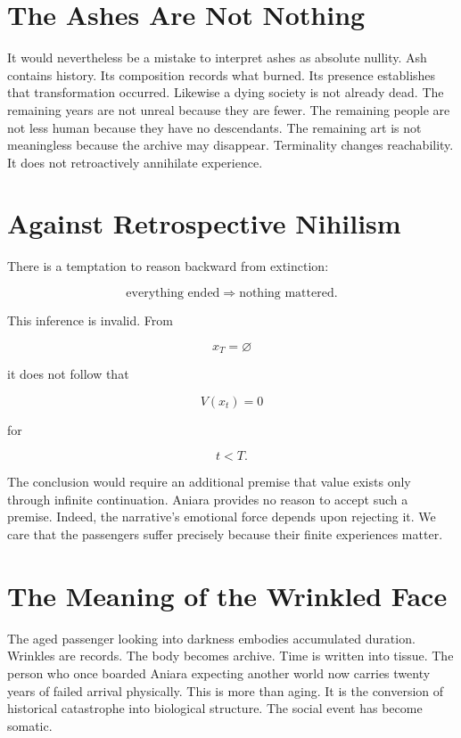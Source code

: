 \documentclass[11pt,oneside]{book}
\theoremstyle{definition}
\theoremstyle{remark}
\begin{document}
\section{The Ashes Are Not Nothing}

It would nevertheless be a mistake to interpret ashes as absolute nullity. Ash contains history. Its
composition records what burned. Its presence establishes that transformation occurred. Likewise a
dying society is not already dead. The remaining years are not unreal because they are fewer. The
remaining people are not less human because they have no descendants. The remaining art is not
meaningless because the archive may disappear. Terminality changes reachability. It does not
retroactively annihilate experience.

\section{Against Retrospective Nihilism}

There is a temptation to reason backward from extinction:

\[
\text{everything ended} \Rightarrow \text{nothing mattered}.
\]

This inference is invalid. From

\[
x_T=\varnothing
\]

it does not follow that

\[
V(x_t)=0
\]

for

\[
t<T.
\]

The conclusion would require an additional premise that value exists only through infinite
continuation. Aniara provides no reason to accept such a premise. Indeed, the narrative's emotional
force depends upon rejecting it. We care that the passengers suffer precisely because their finite
experiences matter.

\section{The Meaning of the Wrinkled Face}

The aged passenger looking into darkness embodies accumulated duration. Wrinkles are records. The
body becomes archive. Time is written into tissue. The person who once boarded Aniara expecting
another world now carries twenty years of failed arrival physically. This is more than aging. It is
the conversion of historical catastrophe into biological structure. The social event has become
somatic.
\end{document}
